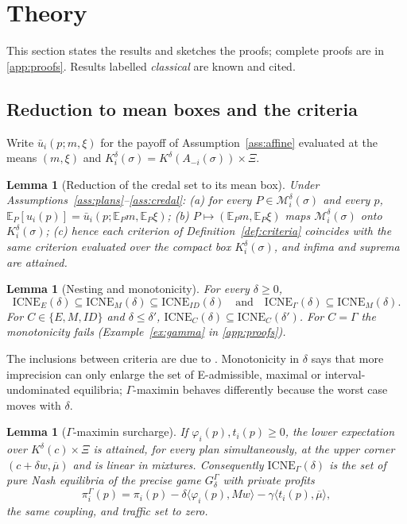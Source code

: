\documentclass[preprint,12pt]{elsarticle}
\newtheorem{lemma}[theorem]{Lemma}
\theoremstyle{definition}
\theoremstyle{remark}
\newcommand{\E}{\mathbb{E}}
\newcommand{\cM}{\mathcal{M}}
\newcommand{\ub}{\bar u}
\newcommand{\ICNE}{\mathrm{ICNE}}
\newcommand{\ip}[2]{\langle #1,#2\rangle}
\begin{document}
\section{Theory}\label{sec:theory}

This section states the results and sketches the proofs; complete proofs are in \ref{app:proofs}. Results labelled \emph{classical} are known and cited.

\subsection{Reduction to mean boxes and the criteria}

Write $\ub_i(p;m,\xi)$ for the payoff of Assumption~\ref{ass:affine} evaluated at the means $(m,\xi)$ and $K_i^\delta(\sigma)=K^\delta(A_{-i}(\sigma))\times\Xi$.

\begin{lemma}[Reduction of the credal set to its mean box]\label{lem:reduction}
Under Assumptions~\ref{ass:plans}--\ref{ass:credal}: (a) for every $P\in\cM_i^\delta(\sigma)$ and every $p$, $\E_P[u_i(p)]=\ub_i(p;\E_Pm,\E_P\xi)$; (b) $P\mapsto(\E_Pm,\E_P\xi)$ maps $\cM_i^\delta(\sigma)$ onto $K_i^\delta(\sigma)$; (c) hence each criterion of Definition~\ref{def:criteria} coincides with the same criterion evaluated over the compact box $K_i^\delta(\sigma)$, and infima and suprema are attained.
\end{lemma}

\begin{lemma}[Nesting and monotonicity]\label{lem:nesting}
For every $\delta\ge0$, \[\ICNE_E(\delta)\subseteq\ICNE_M(\delta)\subseteq\ICNE_{ID}(\delta)\quad\text{and}\quad\ICNE_\Gamma(\delta)\subseteq\ICNE_M(\delta).\] For $C\in\{E,M,ID\}$ and $\delta\le\delta'$, $\ICNE_C(\delta)\subseteq\ICNE_C(\delta')$. For $C=\Gamma$ the monotonicity fails (Example~\ref{ex:gamma} in \ref{app:proofs}).
\end{lemma}

The inclusions between criteria are due to \citet{Troffaes2007}. Monotonicity in $\delta$ says that more imprecision can only enlarge the set of E-admissible, maximal or interval-undominated equilibria; $\Gamma$-maximin behaves differently because the worst case moves with $\delta$.

\begin{lemma}[$\Gamma$-maximin surcharge]\label{lem:gamma}
If $\varphi_i(p),t_i(p)\ge0$, the lower expectation over $K^\delta(c)\times\Xi$ is attained, for every plan simultaneously, at the upper corner $(c+\delta w,\overline\mu)$ and is linear in mixtures. Consequently $\ICNE_\Gamma(\delta)$ is the set of pure Nash equilibria of the precise game $G^\Gamma_\delta$ with private profits
\[
\pi_i^\Gamma(p)=\pi_i(p)-\delta\ip{\varphi_i(p)}{Mw}-\gamma\ip{t_i(p)}{\overline\mu},
\]
the same coupling, and traffic set to zero.
\end{lemma}
\end{document}
